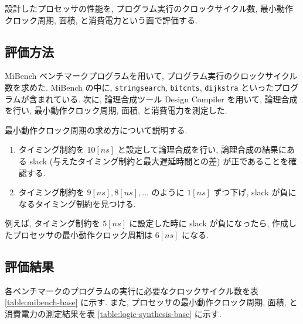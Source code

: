 \documentclass[../main.tex]{subfiles}
\begin{document}
  設計したプロセッサの性能を, プログラム実行のクロックサイクル数, 
  最小動作クロック周期, 面積, と消費電力という面で評価する.

  \subsection{評価方法}
  MiBench ベンチマークプログラムを用いて, プログラム実行のクロックサイクル数を求めた.
  MiBench の中に, \verb|stringsearch|, \verb|bitcnts|, \verb|dijkstra| といったプログラムが含まれている.
  次に, 論理合成ツール Design Compiler を用いて, 
  論理合成を行い, 最小動作クロック周期, 面積, と消費電力を測定した.

  最小動作クロック周期の求め方について説明する.
  \begin{enumerate}
    \item タイミング制約を $10[ns]$ と設定して論理合成を行い, 
    論理合成の結果にある slack (与えたタイミング制約と最大遅延時間との差) が正であることを確認する.
    \item タイミング制約を $9[ns], 8[ns], \dots$ のように $1[ns]$ ずつ下げ, 
    slack が負になるタイミング制約を見つける.
  \end{enumerate}

  例えば, タイミング制約を $5[ns]$ に設定した時に slack が負になったら, 
  作成したプロセッサの最小動作クロック周期は $6[ns]$ になる.

  \subsection{評価結果}
  各ベンチマークのプログラムの実行に必要なクロックサイクル数を表 \ref{table:mibench-base} に示す.
  また, プロセッサの最小動作クロック周期, 面積, と消費電力の測定結果を表 \ref{table:logic-synthesis-base} に示す.

  \begin{table}[tbh]
    \centering
    \caption{ベンチマークプログラムの実行クロックサイクル数}
    \label{table:mibench-base}
  \end{table}

  \begin{table}[tbh]
    \centering
    \caption{論理合成の結果}
    \label{table:logic-synthesis-base}
  \end{table}
\end{document}
